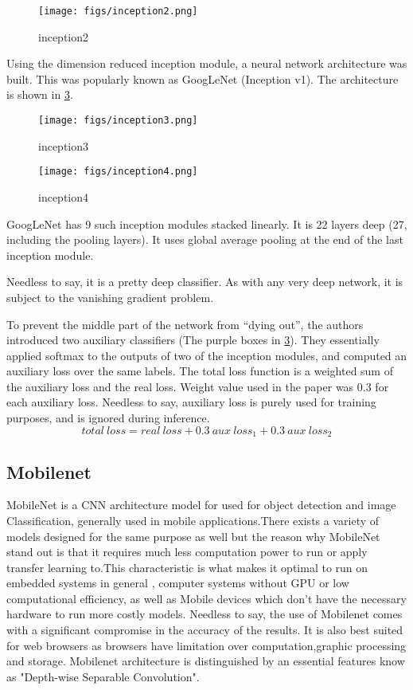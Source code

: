 \begin{figure}[ht]
	\centering
	\texttt{[image: figs/inception2.png]}
	\caption{inception2}\label{fig:inception2}
\end{figure}

Using the dimension reduced inception module, a neural network architecture was built. This was popularly known as GoogLeNet (Inception v1). The architecture is shown in \cref{fig:inception4}.

\begin{figure}[ht]
	\centering
	\texttt{[image: figs/inception3.png]}
	\caption{inception3}\label{fig:inception3}
\end{figure}

\begin{figure}[ht]
	\centering
	\texttt{[image: figs/inception4.png]}
	\caption{inception4}\label{fig:inception4}
\end{figure}

GoogLeNet has 9 such inception modules stacked linearly. It is 22 layers deep (27, including the pooling layers). It uses global average pooling at the end of the last inception module.

Needless to say, it is a pretty deep classifier. As with any very deep network, it is subject to the vanishing gradient problem.

To prevent the middle part of the network from “dying out”, the authors introduced two auxiliary classifiers (The purple boxes in \cref{fig:inception4}). They essentially applied softmax to the outputs of two of the inception modules, and computed an auxiliary loss over the same labels. The total loss function is a weighted sum of the auxiliary loss and the real loss. Weight value used in the paper was 0.3 for each auxiliary loss. Needless to say, auxiliary loss is purely used for training purposes, and is ignored during inference.
$$
total\ loss = real\ loss + 0.3\  aux\ loss_1 + 0.3\  aux\ loss_2
$$

\subsection{Mobilenet}
MobileNet is a CNN architecture model for used for object detection and image Classification, generally used in mobile applications.There exists a variety of models designed for the same purpose as well but the reason why MobileNet stand out is that it requires much less computation power to run or apply transfer learning to.This characteristic is what makes it optimal to run on embedded systems in general , computer systems without GPU or low computational efficiency, as well as Mobile devices which don't have the necessary hardware to run more costly models. Needless to say, the use of Mobilenet  comes with a significant compromise in the accuracy of the results. It is also best suited for web browsers as browsers have limitation over computation,graphic processing and storage. Mobilenet architecture is distinguished by an essential features know as "Depth-wise Separable Convolution".

